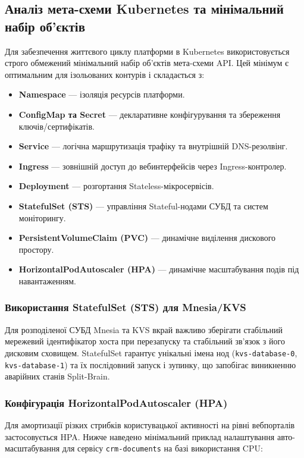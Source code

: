 \subsection{Аналіз мета-схеми Kubernetes та мінімальний набір об'єктів}
Для забезпечення життєвого циклу платформи в Kubernetes використовується строго обмежений мінімальний набір об'єктів мета-схеми API. Цей мінімум є оптимальним для ізольованих контурів і складається з:

\begin{itemize}
    \item \textbf{Namespace} --- ізоляція ресурсів платформи.
    \item \textbf{ConfigMap та Secret} --- декларативне конфігурування та збереження ключів/сертифікатів.
    \item \textbf{Service} --- логічна маршрутизація трафіку та внутрішній DNS-резолвінг.
    \item \textbf{Ingress} --- зовнішній доступ до вебинтерфейсів через Ingress-контролер.
    \item \textbf{Deployment} --- розгортання Stateless-мікросервісів.
    \item \textbf{StatefulSet (STS)} --- управління Stateful-нодами СУБД та систем моніторингу.
    \item \textbf{PersistentVolumeClaim (PVC)} --- динамічне виділення дискового простору.
    \item \textbf{HorizontalPodAutoscaler (HPA)} --- динамічне масштабування подів під навантаженням.
\end{itemize}

\subsubsection{Використання StatefulSet (STS) для Mnesia/KVS}
Для розподіленої СУБД Mnesia та KVS вкрай важливо зберігати стабільний мережевий ідентифікатор хоста при перезапуску та стабільний зв'язок з його дисковим сховищем. StatefulSet гарантує унікальні імена нод (\texttt{kvs-database-0}, \texttt{kvs-database-1}) та їх послідовний запуск і зупинку, що запобігає виникненню аварійних станів Split-Brain.

\subsubsection{Конфігурація HorizontalPodAutoscaler (HPA)}
Для амортизації різких стрибків користувацької активності на рівні вебпорталів застосовується HPA. Нижче наведено мінімальний приклад налаштування авто-масштабування для сервісу \texttt{crm-documents} на базі використання CPU:

